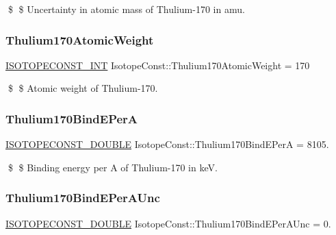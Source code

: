 \$ \$ Uncertainty in atomic mass of Thulium-\/170 in amu. \mbox{\label{group___isotope_const-_thulium-_tm170_gaf92c626e4406455c7d0b209d01cec273}} 
\subsubsection{\texorpdfstring{Thulium170\+Atomic\+Weight}{Thulium170AtomicWeight}}
{\footnotesize\ttfamily \mbox{\hyperlink{group___isotope_const-_macros_ga5f18360b3e99483a35c32d789e62621c}{I\+S\+O\+T\+O\+P\+E\+C\+O\+N\+S\+T\+\_\+\+I\+NT}} Isotope\+Const\+::\+Thulium170\+Atomic\+Weight = 170}

\$ \$ Atomic weight of Thulium-\/170. \mbox{\label{group___isotope_const-_thulium-_tm170_ga628d7e78f3b40ad2ff840f01cd1c42b3}} 
\subsubsection{\texorpdfstring{Thulium170\+Bind\+E\+PerA}{Thulium170BindEPerA}}
{\footnotesize\ttfamily \mbox{\hyperlink{group___isotope_const-_macros_ga8f45a7272ce02c0b4c65c44636ed719a}{I\+S\+O\+T\+O\+P\+E\+C\+O\+N\+S\+T\+\_\+\+D\+O\+U\+B\+LE}} Isotope\+Const\+::\+Thulium170\+Bind\+E\+PerA = 8105.}

\$ \$ Binding energy per A of Thulium-\/170 in keV. \mbox{\label{group___isotope_const-_thulium-_tm170_ga6a42268296d5255e133d794f19a4ef6b}} 
\subsubsection{\texorpdfstring{Thulium170\+Bind\+E\+Per\+A\+Unc}{Thulium170BindEPerAUnc}}
{\footnotesize\ttfamily \mbox{\hyperlink{group___isotope_const-_macros_ga8f45a7272ce02c0b4c65c44636ed719a}{I\+S\+O\+T\+O\+P\+E\+C\+O\+N\+S\+T\+\_\+\+D\+O\+U\+B\+LE}} Isotope\+Const\+::\+Thulium170\+Bind\+E\+Per\+A\+Unc = 0.}

